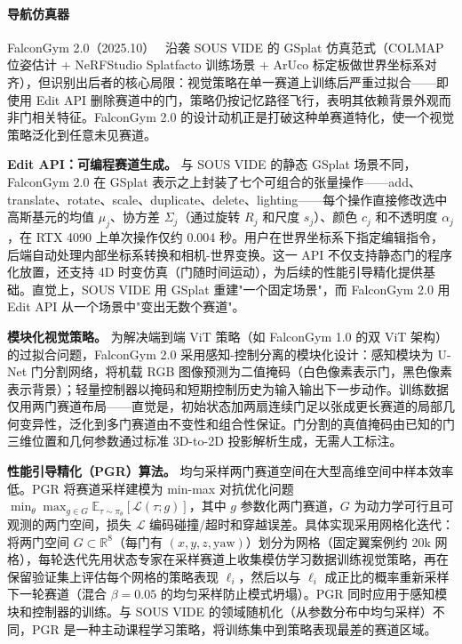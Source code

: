 \paragraph{导航仿真器}

FalconGym 2.0（2025.10）~\cite{2510_02248} 沿袭 SOUS VIDE 的 GSplat 仿真范式（COLMAP 位姿估计 + NeRFStudio Splatfacto 训练场景 + ArUco 标定板做世界坐标系对齐），但识别出后者的核心局限：视觉策略在单一赛道上训练后严重过拟合——即使用 Edit API 删除赛道中的门，策略仍按记忆路径飞行，表明其依赖背景外观而非门相关特征。FalconGym 2.0 的设计动机正是打破这种单赛道特化，使一个视觉策略泛化到任意未见赛道。

\textbf{Edit API：可编程赛道生成。}
与 SOUS VIDE 的静态 GSplat 场景不同，FalconGym 2.0 在 GSplat 表示之上封装了七个可组合的张量操作——add、translate、rotate、scale、duplicate、delete、lighting——每个操作直接修改选中高斯基元的均值 $\mu_j$、协方差 $\Sigma_j$（通过旋转 $R_j$ 和尺度 $s_j$）、颜色 $c_j$ 和不透明度 $\alpha_j$，在 RTX 4090 上单次操作仅约 0.004 秒。用户在世界坐标系下指定编辑指令，后端自动处理内部坐标系转换和相机-世界变换。这一 API 不仅支持静态门的程序化放置，还支持 4D 时变仿真（门随时间运动），为后续的性能引导精化提供基础。直觉上，SOUS VIDE 用 GSplat 重建"一个固定场景"，而 FalconGym 2.0 用 Edit API 从一个场景中"变出无数个赛道"。

\textbf{模块化视觉策略。}
为解决端到端 ViT 策略（如 FalconGym 1.0 的双 ViT 架构）的过拟合问题，FalconGym 2.0 采用感知-控制分离的模块化设计：感知模块为 U-Net 门分割网络，将机载 RGB 图像预测为二值掩码（白色像素表示门，黑色像素表示背景）；轻量控制器以掩码和短期控制历史为输入输出下一步动作。训练数据仅用两门赛道布局——直觉是，初始状态加两扇连续门足以张成更长赛道的局部几何变异性，泛化到多门赛道由不变性和组合性保证。门分割的真值掩码由已知的门三维位置和几何参数通过标准 3D-to-2D 投影解析生成，无需人工标注。

\textbf{性能引导精化（PGR）算法。}
均匀采样两门赛道空间在大型高维空间中样本效率低。PGR 将赛道采样建模为 min-max 对抗优化问题 $\min_\theta \max_{g \in G} \mathbb{E}_{\tau \sim \pi_\theta}[\mathcal{L}(\tau; g)]$，其中 $g$ 参数化两门赛道，$G$ 为动力学可行且可观测的两门空间，损失 $\mathcal{L}$ 编码碰撞/超时和穿越误差。具体实现采用网格化迭代：将两门空间 $G \subset \mathbb{R}^8$（每门有 $(x, y, z, \text{yaw})$）划分为网格（固定翼案例约 20k 网格），每轮迭代先用状态专家在采样赛道上收集模仿学习数据训练视觉策略，再在保留验证集上评估每个网格的策略表现 $\ell_i$，然后以与 $\ell_i$ 成正比的概率重新采样下一轮赛道（混合 $\beta=0.05$ 的均匀采样防止模式坍塌）。PGR 同时应用于感知模块和控制器的训练。与 SOUS VIDE 的领域随机化（从参数分布中均匀采样）不同，PGR 是一种主动课程学习策略，将训练集中到策略表现最差的赛道区域。

